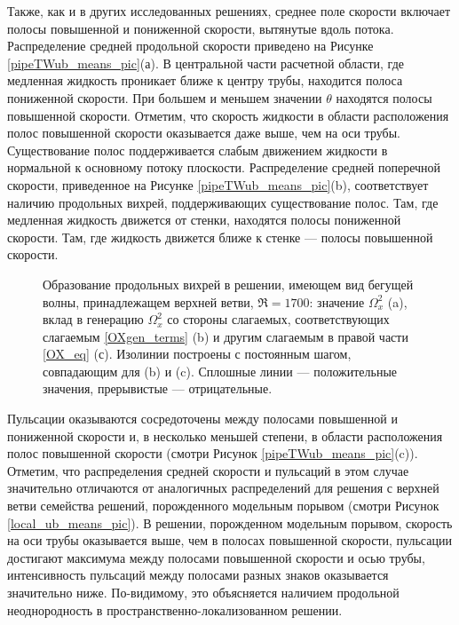 Также, как и в других исследованных решениях, среднее поле скорости включает полосы повышенной и пониженной скорости, вытянутые вдоль потока. Распределение средней продольной скорости приведено на Рисунке \ref{pipeTWub_means_pic}(а). В центральной части расчетной области, где медленная жидкость проникает ближе к центру трубы, находится полоса пониженной скорости. При большем и меньшем значении $\theta$ находятся полосы повышенной скорости. Отметим, что скорость жидкости в области расположения полос повышенной скорости оказывается даже выше, чем на оси трубы. Существование полос поддерживается слабым движением жидкости в нормальной к основному потоку плоскости. Распределение средней поперечной скорости, приведенное на Рисунке \ref{pipeTWub_means_pic}(b), соответствует наличию продольных вихрей, поддерживающих существование полос. Там, где медленная жидкость движется от стенки, находятся полосы пониженной скорости. Там, где жидкость движется ближе к стенке --- полосы повышенной скорости. 

\begin{figure}
\caption{Образование продольных вихрей в решении, имеющем вид бегущей волны, принадлежащем верхней ветви, $\Re = 1700$: значение $\Omega_x^2$ (a), вклад в генерацию $\Omega_x^2$ со стороны слагаемых, соответствующих слагаемым \eqref{OXgen_terms} (b) и другим слагаемым в правой части \eqref{OX_eq} (с). Изолинии построены с постоянным шагом, совпадающим для (b) и (c). Сплошные линии --- положительные значения, прерывистые --- отрицательные.}
\label{pipeTWub_OXgen_pic}
\end{figure}

Пульсации оказываются сосредоточены между полосами повышенной и пониженной скорости и, в несколько меньшей степени, в области расположения полос повышенной скорости (смотри Рисунок \ref{pipeTWub_means_pic}(c)). Отметим, что распределения средней скорости и пульсаций в этом случае значительно отличаются от аналогичных распределений для решения с верхней ветви семейства решений, порожденного модельным порывом (смотри Рисунок \ref{local_ub_means_pic}). В решении, порожденном модельным порывом, скорость на оси трубы оказывается выше, чем в полосах повышенной скорости, пульсации достигают максимума между полосами повышенной скорости и осью трубы, интенсивность пульсаций между полосами разных знаков оказывается значительно ниже. По-видимому, это объясняется наличием продольной неоднородность в пространственно-локализованном решении. 

